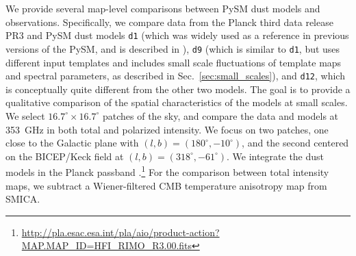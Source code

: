 \documentclass[twocolumn]{aastex631}
\begin{document}
We provide several map-level comparisons between PySM dust models and observations. 
Specifically, we compare data from the Planck third data release PR3 \cite{planck2016-l03} and PySM dust models \texttt{d1} (which was widely used as a reference in previous versions of the PySM, and is described in \cite{Thorne:2017}), {\tt d9} (which is similar to \texttt{d1}, but uses different input templates and includes small scale fluctuations of template maps and spectral parameters, as described in Sec.~\ref{sec:small_scales}), and {\tt d12}, which is conceptually quite different from the other two models. The goal is to provide a qualitative comparison of the spatial characteristics of the models at small scales. We select $16.7^\circ \times 16.7^\circ$ patches of the sky, and compare the data and models at 353~GHz in both total and polarized intensity. We focus on two patches, one close to the Galactic plane with $(l,b) =(180^\circ,-10^\circ)$, and the second centered on the BICEP/Keck field at $(l,b) =(318^\circ,-61^\circ)$. 
We integrate the dust models in the Planck passband \citep{planck2013-p03d}.\footnote{\url{http://pla.esac.esa.int/pla/aio/product-action?MAP.MAP_ID=HFI_RIMO_R3.00.fits}} For the comparison between total intensity maps, we subtract a Wiener-filtered CMB temperature anisotropy map from SMICA.
\end{document}
